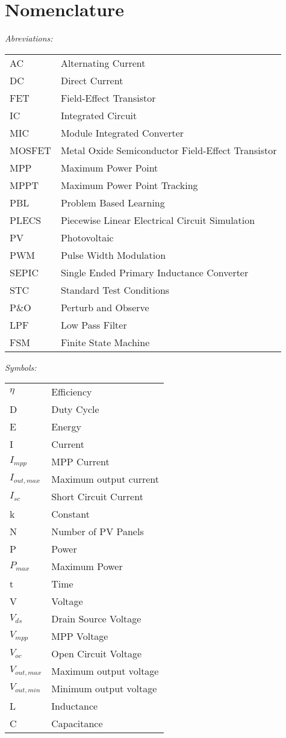 \chapter*{Nomenclature}

\vspace{-10mm} %
\textit{Abreviations:}\newline
\begin{tabular}{ll} %
AC & Alternating Current\\
DC & Direct Current\\
FET & Field-Effect Transistor\\
IC & Integrated Circuit\\
MIC & Module Integrated Converter\\
MOSFET & Metal Oxide Semiconductor Field-Effect Transistor\\
MPP & Maximum Power Point\\
MPPT & Maximum Power Point Tracking\\
PBL & Problem Based Learning\\
PLECS & Piecewise Linear Electrical Circuit Simulation\\
PV & Photovoltaic\\
PWM & Pulse Width Modulation\\
SEPIC & Single Ended Primary Inductance Converter\\
STC & Standard Test Conditions\\
P\&O & Perturb and Observe\\
LPF & Low Pass Filter\\
FSM & Finite State Machine
\end{tabular}

\vspace{5mm} %

\noindent\textit{Symbols:}\newline
\begin{tabular}{ll}
$\eta$ & Efficiency\\
D & Duty Cycle\\
E & Energy\\
I & Current\\
$I_{mpp}$ & MPP Current\\
$I_{out,max}$ & Maximum output current \\
$I_{sc}$ & Short Circuit Current\\
k & Constant \\
N & Number of PV Panels \\
P & Power\\
$P_{max}$ & Maximum Power\\
t & Time\\
V & Voltage\\
$V_{ds}$ & Drain Source Voltage\\
$V_{mpp}$ & MPP Voltage\\
$V_{oc}$ & Open Circuit Voltage\\
$V_{out,max}$ & Maximum output voltage \\
$V_{out,min}$ & Minimum output voltage \\
L & Inductance\\
C & Capacitance\\
\end{tabular}